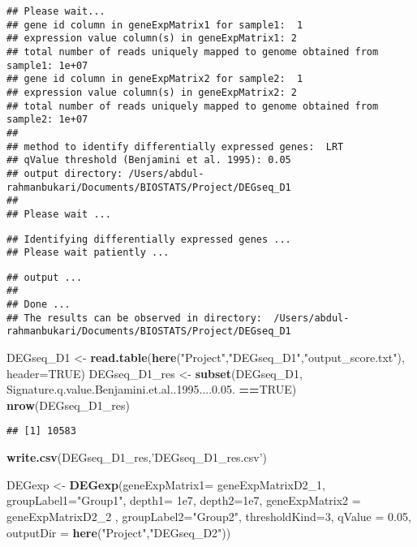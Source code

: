 \documentclass[]{article}
\newenvironment{Shaded}{\begin{snugshade}}{\end{snugshade}}
\newcommand{\DataTypeTok}[1]{\textcolor[rgb]{0.13,0.29,0.53}{#1}}
\newcommand{\DecValTok}[1]{\textcolor[rgb]{0.00,0.00,0.81}{#1}}
\newcommand{\FloatTok}[1]{\textcolor[rgb]{0.00,0.00,0.81}{#1}}
\newcommand{\KeywordTok}[1]{\textcolor[rgb]{0.13,0.29,0.53}{\textbf{#1}}}
\newcommand{\NormalTok}[1]{#1}
\newcommand{\OperatorTok}[1]{\textcolor[rgb]{0.81,0.36,0.00}{\textbf{#1}}}
\newcommand{\OtherTok}[1]{\textcolor[rgb]{0.56,0.35,0.01}{#1}}
\newcommand{\StringTok}[1]{\textcolor[rgb]{0.31,0.60,0.02}{#1}}
\begin{document}
\begin{verbatim}
## Please wait...
## gene id column in geneExpMatrix1 for sample1:  1 
## expression value column(s) in geneExpMatrix1: 2 
## total number of reads uniquely mapped to genome obtained from sample1: 1e+07 
## gene id column in geneExpMatrix2 for sample2:  1 
## expression value column(s) in geneExpMatrix2: 2 
## total number of reads uniquely mapped to genome obtained from sample2: 1e+07 
## 
## method to identify differentially expressed genes:  LRT 
## qValue threshold (Benjamini et al. 1995): 0.05 
## output directory: /Users/abdul-rahmanbukari/Documents/BIOSTATS/Project/DEGseq_D1 
## 
## Please wait ...
\end{verbatim}

\begin{verbatim}
## Identifying differentially expressed genes ...
## Please wait patiently ...
\end{verbatim}

\begin{verbatim}
## output ...
## 
## Done ...
## The results can be observed in directory:  /Users/abdul-rahmanbukari/Documents/BIOSTATS/Project/DEGseq_D1
\end{verbatim}

\begin{Shaded}
\begin{Highlighting}[]
\NormalTok{DEGseq_D1 <-}\StringTok{ }\KeywordTok{read.table}\NormalTok{(}\KeywordTok{here}\NormalTok{(}\StringTok{"Project"}\NormalTok{,}\StringTok{"DEGseq_D1"}\NormalTok{,}\StringTok{"output_score.txt"}\NormalTok{), }\DataTypeTok{header=}\OtherTok{TRUE}\NormalTok{)}
\NormalTok{DEGseq_D1_res <-}\StringTok{ }\KeywordTok{subset}\NormalTok{(DEGseq_D1, Signature.q.value.Benjamini.et.al..}\DecValTok{1995}\NormalTok{....}\DecValTok{0}\NormalTok{.}\FloatTok{05.} \OperatorTok{==}\OtherTok{TRUE}\NormalTok{)}
\KeywordTok{nrow}\NormalTok{(DEGseq_D1_res)}
\end{Highlighting}
\end{Shaded}

\begin{verbatim}
## [1] 10583
\end{verbatim}

\begin{Shaded}
\begin{Highlighting}[]
\KeywordTok{write.csv}\NormalTok{(DEGseq_D1_res,}\StringTok{'DEGseq_D1_res.csv'}\NormalTok{)}

\NormalTok{DEGexp <-}\StringTok{ }\KeywordTok{DEGexp}\NormalTok{(}\DataTypeTok{geneExpMatrix1=}\NormalTok{ geneExpMatrixD2_}\DecValTok{1}\NormalTok{, }\DataTypeTok{groupLabel1=}\StringTok{"Group1"}\NormalTok{, }\DataTypeTok{depth1=} \FloatTok{1e7}\NormalTok{, }\DataTypeTok{depth2=}\FloatTok{1e7}\NormalTok{, }\DataTypeTok{geneExpMatrix2 =}\NormalTok{ geneExpMatrixD2_}\DecValTok{2}\NormalTok{ , }\DataTypeTok{groupLabel2=}\StringTok{"Group2"}\NormalTok{, }\DataTypeTok{thresholdKind=}\DecValTok{3}\NormalTok{, }\DataTypeTok{qValue =} \FloatTok{0.05}\NormalTok{, }\DataTypeTok{outputDir =} \KeywordTok{here}\NormalTok{(}\StringTok{"Project"}\NormalTok{,}\StringTok{"DEGseq_D2"}\NormalTok{))}
\end{Highlighting}
\end{Shaded}
\end{document}
